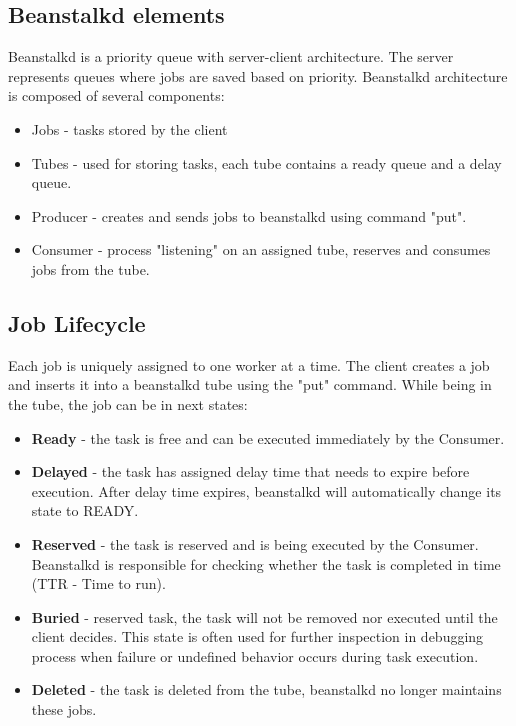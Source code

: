     \subsection{Beanstalkd elements}
    Beanstalkd is a priority queue with server-client architecture. The server represents queues where jobs are saved based on priority. Beanstalkd architecture is composed of several components:
    \begin{itemize}
        \item Jobs - tasks stored by the client
        \item Tubes - used for storing tasks, each tube contains a ready queue and a delay queue.
        \item Producer - creates and sends jobs to beanstalkd using command "put".
        \item Consumer - process "listening" on an assigned tube, reserves and consumes jobs from the tube.
    \end{itemize}

    \subsection{Job Lifecycle}
    Each job is uniquely assigned to one worker at a time. The client creates a job and inserts it into a beanstalkd tube using the "put" command. While being in the tube, the job can be in next states\cite{beanstalkdProtocol}:
    \begin{itemize}
        \item \textbf{Ready} - the task is free and can be executed immediately by the Consumer.
        \item \textbf{Delayed} - the task has assigned delay time that needs to expire before execution. After delay time expires, beanstalkd will automatically change its state to READY.
        \item \textbf{Reserved} - the task is reserved and is being executed by the Consumer. Beanstalkd is responsible for checking whether the task is completed in time (TTR - Time to run).
        \item \textbf{Buried} - reserved task, the task will not be removed nor executed until the client decides. This state is often used for further inspection in debugging process when failure or undefined behavior occurs during task execution.
        \item \textbf{Deleted} - the task is deleted from the tube, beanstalkd no longer maintains these jobs.
    \end{itemize}

